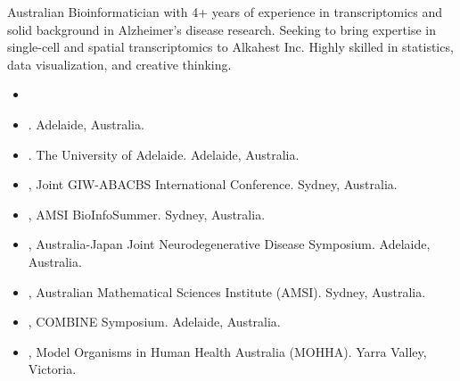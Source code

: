 \documentclass[10pt,a4paper,ragged2e,withhyper]{altacv2}
\begin{document}
\begin{paracol}{2}
\switchcolumn


Australian Bioinformatician with 4+ years of experience in transcriptomics and solid background in Alzheimer's disease research. Seeking to bring expertise in single-cell and spatial transcriptomics to Alkahest Inc. Highly skilled in statistics, data visualization, and creative thinking. 

\begin{itemize}
  \item {}
  \smallskip
  \item {}. Adelaide, Australia.
  \smallskip
  \item {}. The University of Adelaide. Adelaide, Australia.
  \smallskip
  \item {}, Joint GIW-ABACBS International Conference. Sydney, Australia.
  \smallskip
  \item {}, AMSI BioInfoSummer. Sydney, Australia.
  \smallskip
  \item {}, Australia-Japan Joint Neurodegenerative Disease Symposium. Adelaide, Australia.
  \smallskip
  \item {}, Australian Mathematical Sciences Institute (AMSI). Sydney, Australia.
  \smallskip
  \item {}, COMBINE Symposium. Adelaide, Australia.
  \smallskip
  \item {}, Model Organisms in Human Health Australia (MOHHA). Yarra Valley, Victoria.
\end{itemize}


\end{paracol}
\end{document}
